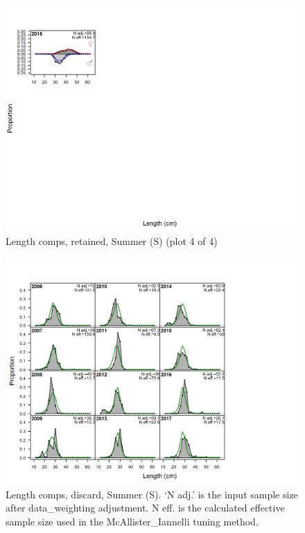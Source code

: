 \documentclass[12pt,]{article}
\begin{document}
\begin{figure}
\centering
\includegraphics{r4ss/plots_mod1/comp_lenfit_flt4mkt2_page4.png}
\caption{Length comps, retained, Summer (S) (plot 4 of 4)
\label{fig:length_fits}}
\end{figure}

\begin{figure}
\centering
\includegraphics{r4ss/plots_mod1/comp_lenfit_flt4mkt1.png}
\caption{Length comps, discard, Summer (S). `N adj.' is the input sample
size after data\_weighting adjustment. N eff. is the calculated
effective sample size used in the McAllister\_Iannelli tuning method.
\label{fig:length_fits}}
\end{figure}
\end{document}
